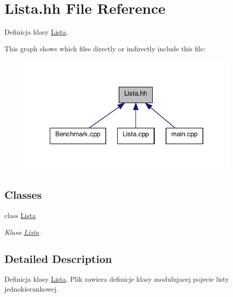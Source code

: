 \hypertarget{a00013}{\section{Lista.\-hh File Reference}
\label{a00013}
}


Definicja klasy \hyperlink{a00004}{Lista}.  


This graph shows which files directly or indirectly include this file\-:\nopagebreak
\begin{figure}[H]
\begin{center}
\leavevmode
\includegraphics[width=312pt]{a00027}
\end{center}
\end{figure}
\subsection*{Classes}
\begin{DoxyCompactItemize}
\item 
class \hyperlink{a00004}{Lista}
\begin{DoxyCompactList}\small\item\em Klasa \hyperlink{a00004}{Lista}. \end{DoxyCompactList}\end{DoxyCompactItemize}


\subsection{Detailed Description}
Definicja klasy \hyperlink{a00004}{Lista}. Plik zawiera definicje klasy modulujacej pojecie listy jednokierunkowej. 